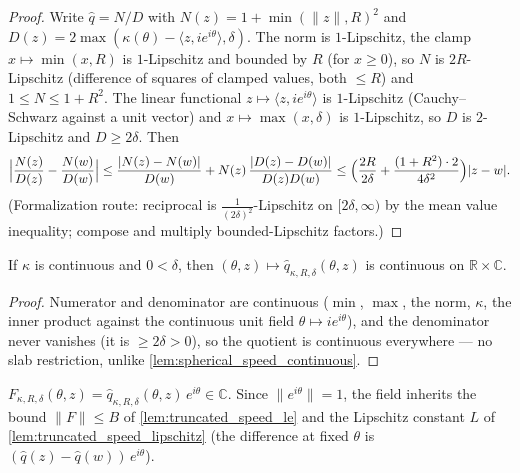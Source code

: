 \begin{proof}

\leanok
  Write $\hat q=N/D$ with $N(z)=1+\min(\|z\|,R)^2$ and
  $D(z)=2\max(\kappa(\theta)-\langle z,i e^{i\theta}\rangle,\delta)$. The norm is
  $1$-Lipschitz, the clamp $x\mapsto\min(x,R)$ is $1$-Lipschitz and bounded by $R$ (for
  $x\ge0$), so $N$ is $2R$-Lipschitz (difference of squares of clamped values, both
  $\le R$) and $1\le N\le 1+R^2$. The linear functional
  $z\mapsto\langle z,i e^{i\theta}\rangle$ is $1$-Lipschitz (Cauchy--Schwarz against a unit
  vector) and $x\mapsto\max(x,\delta)$ is $1$-Lipschitz, so $D$ is $2$-Lipschitz and
  $D\ge 2\delta$. Then
  \[
    \Bigl|\frac{N(z)}{D(z)}-\frac{N(w)}{D(w)}\Bigr|
    \le\frac{|N(z)-N(w)|}{D(w)}+N(z)\,\frac{|D(z)-D(w)|}{D(z)D(w)}
    \le\Bigl(\frac{2R}{2\delta}+\frac{(1+R^2)\cdot2}{4\delta^2}\Bigr)|z-w| .
  \]
  (Formalization route: reciprocal is $\tfrac1{(2\delta)^2}$-Lipschitz on
  $[2\delta,\infty)$ by the mean value inequality; compose and multiply
  bounded-Lipschitz factors.)
\end{proof}

\begin{lemma}

  \label{lem:truncated_speed_continuous}
  If $\kappa$ is continuous and $0<\delta$, then
  $(\theta,z)\mapsto\hat q_{\kappa,R,\delta}(\theta,z)$ is continuous on
  $\mathbb R\times\mathbb C$.
\end{lemma}

\begin{proof}

\leanok
  Numerator and denominator are continuous ($\min$, $\max$, the norm, $\kappa$, the inner
  product against the continuous unit field $\theta\mapsto i e^{i\theta}$), and the
  denominator never vanishes (it is $\ge 2\delta>0$), so the quotient is continuous
  everywhere — no slab restriction, unlike \cref{lem:spherical_speed_continuous}.
\end{proof}

\begin{definition}

  \label{def:truncated_field}
  $F_{\kappa,R,\delta}(\theta,z)=\hat q_{\kappa,R,\delta}(\theta,z)\,e^{i\theta}
   \in\mathbb C$. Since $\|e^{i\theta}\|=1$, the field inherits the bound
  $\|F\|\le B$ of \cref{lem:truncated_speed_le} and the Lipschitz constant $L$ of
  \cref{lem:truncated_speed_lipschitz} (the difference at fixed $\theta$ is
  $(\hat q(z)-\hat q(w))\,e^{i\theta}$).
\end{definition}


